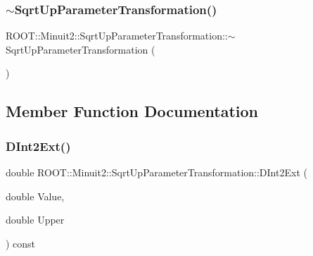 \subsubsection{\texorpdfstring{$\sim$SqrtUpParameterTransformation()}{~SqrtUpParameterTransformation()}\hspace{0.1cm}{\footnotesize\ttfamily [3/3]}}
{\footnotesize\ttfamily R\+O\+O\+T\+::\+Minuit2\+::\+Sqrt\+Up\+Parameter\+Transformation\+::$\sim$\+Sqrt\+Up\+Parameter\+Transformation (\begin{DoxyParamCaption}{ }\end{DoxyParamCaption})\hspace{0.3cm}{\ttfamily [inline]}}



\subsection{Member Function Documentation}
\mbox{\label{classROOT_1_1Minuit2_1_1SqrtUpParameterTransformation_a82e3860242c4f0d7a81dabef95803bd1}} 
\subsubsection{\texorpdfstring{DInt2Ext()}{DInt2Ext()}\hspace{0.1cm}{\footnotesize\ttfamily [1/3]}}
{\footnotesize\ttfamily double R\+O\+O\+T\+::\+Minuit2\+::\+Sqrt\+Up\+Parameter\+Transformation\+::\+D\+Int2\+Ext (\begin{DoxyParamCaption}\item[{double}]{Value,  }\item[{double}]{Upper }\end{DoxyParamCaption}) const}

